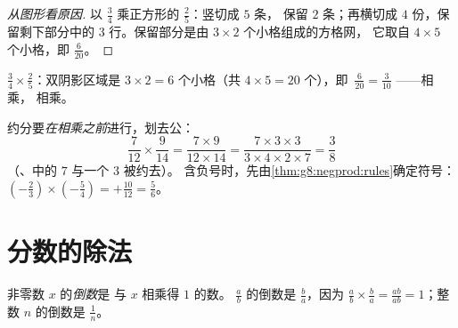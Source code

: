 \begin{proof}[从图形看原因]
以 $\frac34$ 乘正方形的 $\frac25$：竖切成 $5$ 条，
保留 $2$ 条；再横切成 $4$ 份，保留剩下部分中的 $3$
行。保留部分是由 $3 \times 2$ 个小格组成的方格网，
它取自 $4 \times 5$ 个小格，即 $\frac{6}{20}$。
\end{proof}

\begin{omfigure}

{\small $\frac34 \times \frac25$：双阴影区域是
$3 \times 2 = 6$ 个小格（共 $4 \times 5 = 20$ 个），即\
$\frac{6}{20} = \frac{3}{10}$ ——相乘，
相乘。}
\end{omfigure}

\begin{example}\label{ex:g8:fractions:mult}
约分要\emph{在相乘之前}进行，划去公：
\[
\frac{7}{12} \times \frac{9}{14}
= \frac{7 \times 9}{12 \times 14}
= \frac{7 \times 3 \times 3}{3 \times 4 \times 2 \times 7}
= \frac{3}{8}
\]
（、中的 $7$ 与一个 $3$ 被约去）。
含负号时，先由\cref{thm:g8:negprod:rules}确定符号：
$\left(-\frac23\right) \times \left(-\frac{5}{4}\right) =
+\frac{10}{12} = \frac56$。
\end{example}

\section{分数的除法}

\begin{definition}[倒数]\label{def:g8:fractions:inverse}
非零数 $x$ 的\emph{倒数}是
与 $x$ 相乘得 $1$ 的数。
$\frac ab$ 的倒数是 $\frac ba$，因为
$\frac ab \times \frac ba = \frac{ab}{ab} = 1$；整数 $n$ 的倒数是
$\frac1n$。
\end{definition}

